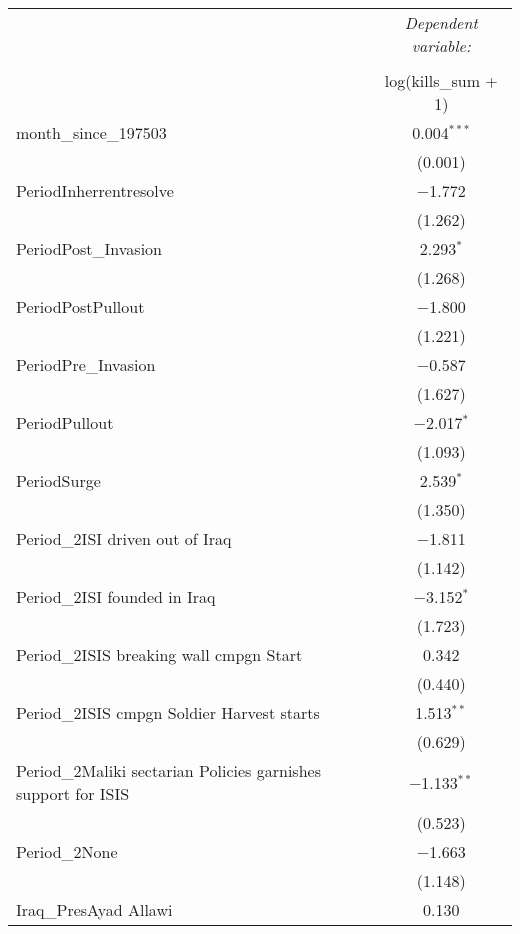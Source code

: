 \begin{table}[ht] \centering 
  \label{tab:robustreg} 
\begin{adjustbox}{width=1\textwidth}
\small 
\begin{tabular}{@{\extracolsep{5pt}}lc} 
\\[-1.8ex]\hline 
 & \multicolumn{1}{c}{\textit{Dependent variable:}} \\ 
\cline{2-2} 
\\[-1.8ex] & log(kills\_sum + 1) \\ 

 month\_since\_197503 & 0.004$^{***}$ \\ 
  & (0.001) \\ 
 PeriodInherrentresolve & $-$1.772 \\ 
  & (1.262) \\ 
 PeriodPost\_Invasion & 2.293$^{*}$ \\ 
  & (1.268) \\ 
 PeriodPostPullout & $-$1.800 \\ 
  & (1.221) \\ 
 PeriodPre\_Invasion & $-$0.587 \\ 
  & (1.627) \\ 
 PeriodPullout & $-$2.017$^{*}$ \\ 
  & (1.093) \\
 PeriodSurge & 2.539$^{*}$ \\ 
  & (1.350) \\
 Period\_2ISI driven out of Iraq & $-$1.811 \\ 
  & (1.142) \\
 Period\_2ISI founded in Iraq & $-$3.152$^{*}$ \\ 
  & (1.723) \\
 Period\_2ISIS breaking wall cmpgn Start & 0.342 \\ 
  & (0.440) \\
 Period\_2ISIS cmpgn Soldier Harvest starts & 1.513$^{**}$ \\ 
  & (0.629) \\
 Period\_2Maliki sectarian Policies garnishes support for ISIS & $-$1.133$^{**}$ \\ 
  & (0.523) \\
 Period\_2None & $-$1.663 \\ 
  & (1.148) \\
 Iraq\_PresAyad Allawi & 0.130 \\ 

\end{tabular}
\end{adjustbox}
\end{table}
